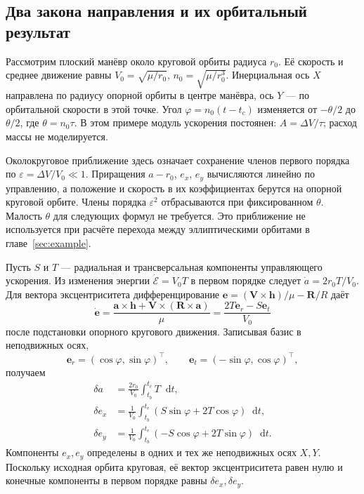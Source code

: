 \documentclass[a4paper,11pt]{article}
\newcommand{\dd}{\mathop{}\!\mathrm d}
\newcommand{\vect}[1]{\boldsymbol{#1}}
\numberwithin{equation}{section}
\begin{document}
\subsection{Два закона направления и их орбитальный результат}

Рассмотрим плоский манёвр около круговой орбиты радиуса $r_0$.
Её скорость и среднее движение равны
$V_0=\sqrt{\mu/r_0}$, $n_0=\sqrt{\mu/r_0^3}$.
Инерциальная ось $X$ направлена по радиусу опорной орбиты
в центре манёвра, ось $Y$ --- по орбитальной скорости
в этой точке. Угол $\varphi=n_0(t-t_c)$ изменяется
от $-\theta/2$ до $\theta/2$, где $\theta=n_0\tau$.
В этом примере модуль ускорения постоянен:
$A=\Delta V/\tau$; расход массы не моделируется.

Околокруговое приближение здесь означает сохранение членов
первого порядка по $\varepsilon=\Delta V/V_0\ll1$.
Приращения $a-r_0$, $e_x$, $e_y$ вычисляются линейно
по управлению, а положение и скорость в их коэффициентах
берутся на опорной круговой орбите. Члены порядка
$\varepsilon^2$ отбрасываются при фиксированном $\theta$.
Малость $\theta$ для следующих формул не требуется.
Это приближение не используется при расчёте перехода
между эллиптическими орбитами в главе~\ref{sec:example}.

Пусть $S$ и $T$ --- радиальная и трансверсальная компоненты
управляющего ускорения. Из изменения энергии
$\dot{\mathcal E}=V_0T$ в первом порядке следует
$\dot a=2r_0T/V_0$.
Для вектора эксцентриситета дифференцирование
$\vect e=(\vect V\times\vect h)/\mu-\vect R/R$ даёт
\[
\dot{\vect e}
=\frac{\vect a\times\vect h+
        \vect V\times(\vect R\times\vect a)}{\mu}
=\frac{2T\vect e_r-S\vect e_t}{V_0}
\]
после подстановки опорного кругового движения. Записывая базис
в неподвижных осях,
\[
\vect e_r=(\cos\varphi,\sin\varphi)^\top,\qquad
\vect e_t=(-\sin\varphi,\cos\varphi)^\top,
\]
получаем
\begin{equation}
\begin{aligned}
\delta a&=\frac{2r_0}{V_0}\int_{t_b}^{t_e}T\dd t,\\
\delta e_x&=\frac1{V_0}\int_{t_b}^{t_e}
       (S\sin\varphi+2T\cos\varphi)\dd t,\\
\delta e_y&=\frac1{V_0}\int_{t_b}^{t_e}
       (-S\cos\varphi+2T\sin\varphi)\dd t.
\end{aligned}
\label{eq:circle-integrals}
\end{equation}
Компоненты $e_x,e_y$ определены в одних и тех же неподвижных
осях $X,Y$. Поскольку исходная орбита круговая,
её вектор эксцентриситета равен нулю и конечные компоненты
в первом порядке равны $\delta e_x,\delta e_y$.
\end{document}
